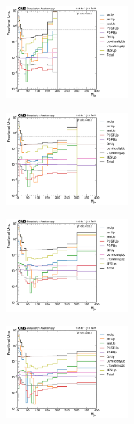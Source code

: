 \begin{figure}[ht!]
  \centering
  \begin{subfigure}
    \centering
    \includegraphics[width=0.45\textwidth]{figures/multijet/dijet/fracUnc_ungroomed_0.pdf}
\end{subfigure} 
  \begin{subfigure}
    \centering
    \includegraphics[width=0.45\textwidth]{figures/multijet/dijet/fracUnc_ungroomed_1.pdf}
\end{subfigure}
  \begin{subfigure}
    \centering
    \includegraphics[width=0.45\textwidth]{figures/multijet/dijet/fracUnc_ungroomed_2.pdf}
\end{subfigure}
  \begin{subfigure}
    \centering
    \includegraphics[width=0.45\textwidth]{figures/multijet/dijet/fracUnc_ungroomed_3.pdf}

\end{subfigure}
\end{figure}
